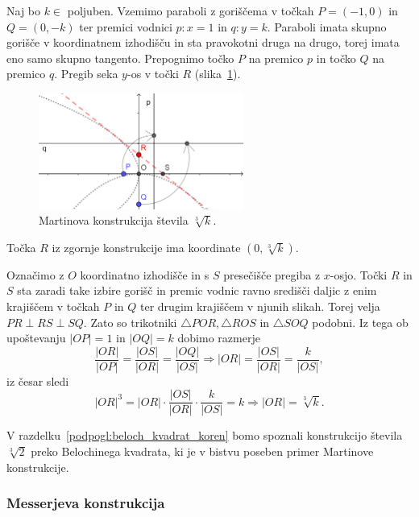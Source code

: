 Naj bo $k \in $ poljuben. Vzemimo paraboli z goriščema v točkah $P = (-1, 0)$ in $Q = (0, -k)$ ter premici vodnici $p: x = 1$ in $q: y = k$. Paraboli imata skupno gorišče v koordinatnem izhodišču in sta pravokotni druga na drugo, torej imata eno samo skupno tangento. Prepognimo točko $P$ na premico $p$ in točko $Q$ na premico $q$. Pregib seka $y$-os v točki $R$ (slika~\ref{fig:martin}).
\begin{figure}[h]
    \centering
    \includegraphics[width=0.6\textwidth]{images/starogr_problemi/cube_martin.png}
    \caption[Martinova konstrukcija kubičnega korena]{Martinova konstrukcija števila $\sqrt[3]{k}$.}
    \label{fig:martin}
\end{figure}
\begin{trditev}
    Točka $R$ iz zgornje konstrukcije ima koordinate $(0, \sqrt[3]{k})$.
\end{trditev}
\begin{dokaz}
    Označimo z $O$ koordinatno izhodišče in s $S$ presečišče pregiba z $x$-osjo. Točki $R$ in $S$ sta zaradi take izbire gorišč in premic vodnic ravno središči daljic z enim krajiščem v točkah $P$ in $Q$ ter drugim krajiščem v njunih slikah. Torej velja $PR \perp RS \perp SQ$. Zato so trikotniki $\triangle POR, \triangle ROS$ in $\triangle SOQ$ podobni. Iz tega ob upoštevanju $|OP| = 1$ in $|OQ| = k$ dobimo razmerje
    $$ \frac{|OR|}{|OP|} = \frac{|OS|}{|OR|} = \frac{|OQ|}{|OS|} \Longrightarrow |OR| = \frac{|OS|}{|OR|} = \frac{k}{|OS|}, $$
    iz česar sledi
    $$ |OR|^3 = |OR| \cdot \frac{|OS|}{|OR|} \cdot \frac{k}{|OS|} = k \Longrightarrow |OR| = \sqrt[3]{k}.$$
\end{dokaz}
\begin{opomba}
    V razdelku~\ref{podpogl:beloch_kvadrat_koren} bomo spoznali konstrukcijo števila $\sqrt[3]{2}$ preko Belochinega kvadrata, ki je v bistvu poseben primer Martinove konstrukcije.
\end{opomba}

\subsubsection*{Messerjeva konstrukcija}

